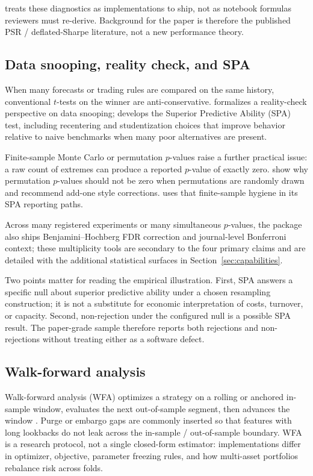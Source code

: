 \documentclass[article]{jss}
\begin{document}
 treats these diagnostics as implementations to ship,
not as notebook formulas reviewers must re-derive.  Background for the
paper is therefore the published PSR / deflated-Sharpe literature, not a
new performance theory.

\subsection{Data snooping, reality check, and SPA}

When many forecasts or trading rules are compared on the same history,
conventional $t$-tests on the winner are anti-conservative.
\citet{White:2000} formalizes a reality-check perspective on data snooping;
\citet{Hansen:2005} develops the Superior Predictive Ability (SPA) test,
including recentering and studentization choices that improve behavior
relative to naive benchmarks when many poor alternatives are present.

Finite-sample Monte Carlo or permutation $p$-values raise a further
practical issue: a raw count of extremes can produce a reported $p$-value
of exactly zero.  \citet{Phipson+Smyth:2010} show why permutation $p$-values
should not be zero when permutations are randomly drawn and recommend
add-one style corrections.   uses that finite-sample hygiene
in its SPA reporting paths.

Across many registered experiments or many simultaneous $p$-values, the package
also ships Benjamini--Hochberg FDR correction \citep{Benjamini+Hochberg:1995}
and journal-level Bonferroni context; these multiplicity tools are secondary to
the four primary claims and are detailed with the additional statistical
surfaces in Section~\ref{sec:capabilities}.

Two points matter for reading the empirical illustration.  First, SPA answers a
specific null about superior predictive ability under a chosen resampling
construction; it is not a substitute for economic interpretation of costs,
turnover, or capacity.  Second, non-rejection under the configured null is a
possible SPA result.  The paper-grade sample therefore reports both rejections
and non-rejections without treating either as a software defect.

\subsection{Walk-forward analysis}

Walk-forward analysis (WFA) optimizes a strategy on a rolling or anchored
in-sample window, evaluates the next out-of-sample segment, then advances
the window \citep{Pardo:2008}.  Purge or embargo gaps are commonly inserted
so that features with long lookbacks do not leak across the in-sample /
out-of-sample boundary.  WFA is a research protocol, not a single
closed-form estimator: implementations differ in optimizer, objective,
parameter freezing rules, and how multi-asset portfolios rebalance risk
across folds.
\end{document}
